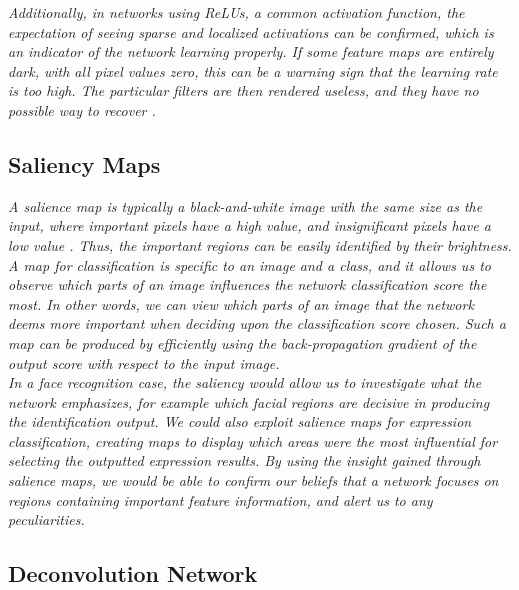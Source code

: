 \noindent \textit{Additionally, in networks using ReLUs, a common activation function, the expectation of seeing sparse and localized activations can be confirmed, which is an indicator of the network learning properly. If some feature maps are entirely dark, with all pixel values zero, this can be a warning sign that the learning rate is too high. The particular filters are then rendered useless, and they have no possible way to recover \cite{cs231n_act}. }

\subsection{Saliency Maps}

\textit{A salience map is typically a black-and-white image with the same size as the input, where important pixels have a high value, and insignificant pixels have a low value \cite{salience}. Thus, the important regions can be easily identified by their brightness. A map for classification is specific to an image and a class, and it allows us to observe which parts of an image influences the network classification score the most. In other words, we can view which parts of an image that the network deems more important when deciding upon the classification score chosen. Such a map can be produced by efficiently using the back-propagation gradient of the output score with respect to the input image.} \\

\noindent \textit{In a face recognition case, the saliency would allow us to investigate what the network emphasizes, for example which facial regions are decisive in producing the identification output. We could also exploit salience maps for expression classification, creating maps to display which areas were the most influential for selecting the outputted expression results. By using the insight gained through salience maps, we would be able to confirm our beliefs that a network focuses on regions containing important feature information, and alert us to any peculiarities.}

\subsection{Deconvolution Network}

